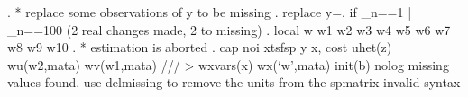 . * replace some observations of y to be missing
. replace y=. if _n==1 | _n==100
(2 real changes made, 2 to missing)
{\smallskip}
. local w w1 w2 w3 w4 w5 w6 w7 w8 w9 w10
{\smallskip}
. * estimation is aborted
. cap noi xtsfsp y x, cost uhet(z) wu(w2,mata) wv(w1,mata) ///
>                     wxvars(x) wx(`w',mata) init(b) nolog
missing values found. use delmissing to remove the units from the spmatrix
invalid syntax
{\smallskip}
